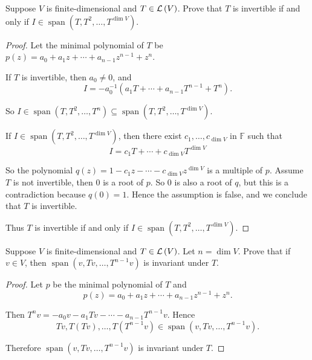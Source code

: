 \begin{exercise}
    Suppose $V$ is finite-dimensional and $T\in\mathcal{L}\left({V}\right)$. Prove that $T$ is invertible if and only if $I\in\operatorname{span}(T, T^{2}, \ldots, T^{\dim V})$.
\end{exercise}

\begin{proof}
    Let the minimal polynomial of $T$ be $p(z) = a_{0} + a_{1}z + \cdots + a_{n-1}z^{n-1} + z^{n}$.

    If $T$ is invertible, then $a_{0}\ne 0$, and
    \[
        I = -a_{0}^{-1}(a_{1}T + \cdots + a_{n-1}T^{n-1} + T^{n}).
    \]

    So $I\in\operatorname{span}(T, T^{2}, \ldots, T^{n})\subseteq \operatorname{span}(T, T^{2}, \ldots, T^{\dim V})$.

    \bigskip
    If $I\in\operatorname{span}(T, T^{2}, \ldots, T^{\dim V})$, then there exist $c_{1}, \ldots, c_{\dim V}$ in $\mathbb{F}$ such that
    \[
        I = c_{1}T + \cdots + c_{\dim V}T^{\dim V}
    \]

    So the polynomial $q(z) = 1 - c_{1}z - \cdots - c_{\dim V}z^{\dim V}$ is a multiple of $p$. Assume $T$ is not invertible, then $0$ is a root of $p$. So $0$ is also a root of $q$, but this is a contradiction because $q(0) = 1$. Hence the assumption is false, and we conclude that $T$ is invertible.

    Thus $T$ is invertible if and only if $I\in\operatorname{span}(T, T^{2}, \ldots, T^{\dim V})$.
\end{proof}
\newpage

\begin{exercise}
    Suppose $V$ is finite-dimensional and $T\in\mathcal{L}\left({V}\right)$. Let $n = \dim V$. Prove that if $v\in V$, then $\operatorname{span}(v, Tv, \ldots, T^{n-1}v)$ is invariant under $T$.
\end{exercise}

\begin{proof}
    Let $p$ be the minimal polynomial of $T$ and
    \[
        p(z) = a_{0} + a_{1}z + \cdots + a_{n-1}z^{n-1} + z^{n}.
    \]

    Then $T^{n}v = -a_{0}v - a_{1}Tv - \cdots - a_{n-1}T^{n-1}v$. Hence
    \[
        Tv, T(Tv), \ldots, T(T^{n-1}v) \in \operatorname{span}(v, Tv, \ldots, T^{n-1}v).
    \]

    Therefore $\operatorname{span}(v, Tv, \ldots, T^{n-1}v)$ is invariant under $T$.
\end{proof}
\newpage

